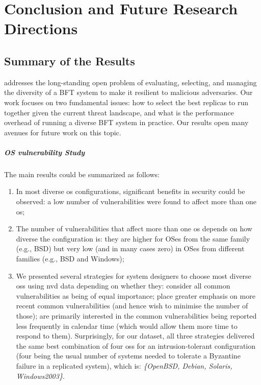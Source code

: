 \chapter{Conclusion and Future Research Directions}
\label{chap:conclusion}

\section{Summary of the Results}
\system addresses the long-standing open problem of evaluating, selecting, and managing the diversity of a BFT system to make it resilient to malicious adversaries.
Our work focuses on two fundamental issues: how to select the best replicas to run together given the current threat landscape, and what is the performance overhead of running a diverse BFT system in practice.
Our results open many avenues for future work on this topic.

\paragraph{OS vulnerability Study}
The main results could be summarized as follows:
\begin{enumerate}
\item In most diverse \gls{os} configurations, significant  benefits in security could be observed: a low number of vulnerabilities were found to affect more than one \gls{os};

\item The number of vulnerabilities that affect more than one \gls{os} depends on how diverse the configuration is: they are higher for OSes from the same family (e.g., BSD) but very low (and in many cases zero) in OSes from different families (e.g., BSD and Windows);

\item We presented several strategies for system designers to choose most diverse \glspl{os} using \gls{nvd} data depending on whether they: consider all common vulnerabilities as being of equal importance; place greater emphasis on more recent common vulnerabilities (and hence wish to minimise the number of those); are primarily interested in the common vulnerabilities being reported less frequently in calendar time (which would allow them more time to respond to them). Surprisingly, for our dataset, all three strategies delivered the same best combination of four \glspl{os} for an intrusion-tolerant configuration (four being the usual number of systems needed to tolerate a Byzantine failure in a replicated system), which is: \textit{\{OpenBSD, Debian, Solaris, Windows2003\}}.

\end{enumerate}



